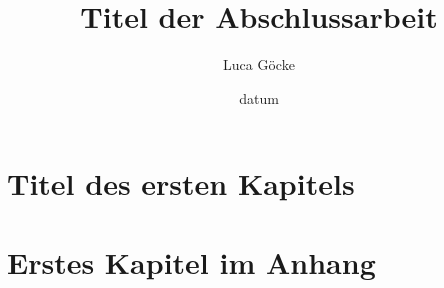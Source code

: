 \documentclass[pstricks,siunitx,theorem,british]{tumphthesis}
\title{Titel der Abschlussarbeit}
\author{Luca Göcke}
\date{datum}
\begin{document}

\frontmatter
\maketitle
\tableofcontents


\mainmatter
\chapter{Titel des ersten Kapitels}




\appendix
\chapter{Erstes Kapitel im Anhang}

\backmatter
\printbibliography
\end{document}
